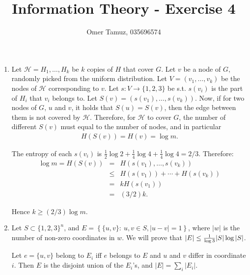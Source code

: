 \documentclass[11pt]{article} \usepackage{amssymb}
\newcommand{\half}{{\textstyle \frac12}}
\newcommand{\fourth}{{\textstyle \frac14}}
\begin{document}
\title{Information Theory - Exercise 4}

 \author{Omer Tamuz, 035696574}
\maketitle


\begin{enumerate}
\item

Let $\mathcal{H}=H_1,\ldots,H_k$ be $k$ copies of $H$ that cover $G$. 
Let $v$ be a node of $G$, randomly picked from the uniform distribution. 
Let $V=(v_1,\ldots,v_k)$ 
be the nodes of $\mathcal{H}$ corresponding to $v$. Let $s:V\to\{1,2,3\}$ be s.t.
$s(v_i)$ is the part of $H_i$ that $v_i$ belongs to. 
Let $S(v)=(s(v_1),\ldots,s(v_k))$. 
Now, if for two nodes of $G$, $u$ and $v$, it holds that $S(u)=S(v)$, then
the edge between them is not covered by $\mathcal{H}$. Therefore, for $\mathcal{H}$
to cover $G$, the
number of different $S(v)$ must equal to the number of nodes, and in particular
\begin{eqnarray*}
  H(S(v))=H(v)=\log m.
\end{eqnarray*}

The entropy of each $s(v_i)$ is $\half\log 2+\fourth\log 4+\fourth \log 4 = 2/3$.
Therefore:
\begin{eqnarray*}
\log m = H(S(v)) &=& H(s(v_1),\ldots,s(v_k))  \\
&\leq& H(s(v_1))+\cdots+H(s(v_k))\\
&=& kH(s(v_1))\\
&=& (3/2)k.
\end{eqnarray*}

Hence $k\geq (2/3)\log m$.
\item

Let $S\subset\{1,2,3\}^n$, and
 $E=\left\{\{u,v\}:\:u,v\in S, |u-v|=1\right\}$, where $|w|$ is the number of
non-zero coordinates in $w$.
We will prove that $|E|\leq {1\over \log 3}|S|\log|S|$.

Let $e=\{u,v\}$ belong to $E_i$ iff $e$ belongs to $E$ and 
$u$ and $v$ differ in coordinate $i$. Then $E$ is the disjoint union of the $E_i$'s,
and $|E|=\sum_i|E_i|$.


\end{enumerate}
\end{document}
